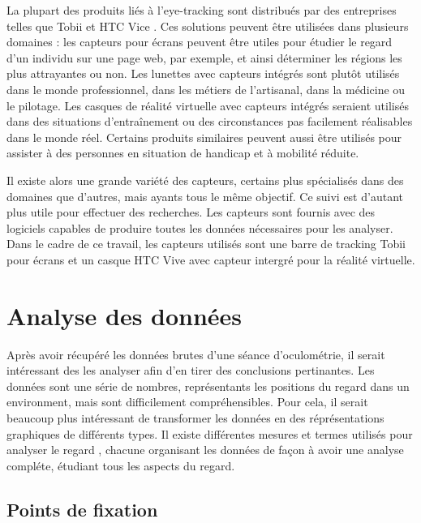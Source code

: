 \documentclass[12pt]{article}
\begin{document}
\bigskip
La plupart des produits liés à l'eye-tracking sont distribués par des
entreprises telles que Tobii \cite{tobii} et HTC Vice \cite{htc_vive_pro_eye}.
Ces solutions peuvent être utilisées dans plusieurs domaines \cite{yt:tobii_vr}
: les capteurs pour écrans peuvent être utiles pour étudier le regard d'un
individu sur une page web, par exemple, et ainsi déterminer les régions les
plus attrayantes ou non. Les lunettes avec capteurs intégrés sont plutôt
utilisés dans le monde professionnel, dans les métiers de l'artisanal, dans la
médicine ou le pilotage. Les casques de réalité virtuelle avec capteurs
intégrés seraient utilisés dans des situations d'entraînement ou des
circonstances pas facilement réalisables dans le monde réel. Certains produits
similaires peuvent aussi être utilisés pour assister à des personnes en
situation de handicap et à mobilité réduite.

\bigskip
Il existe alors une grande variété des capteurs, certains plus spécialisés dans
des domaines que d'autres, mais ayants tous le même objectif. Ce suivi est
d'autant plus utile pour effectuer des recherches. Les capteurs sont fournis
avec des logiciels capables de produire toutes les données nécessaires
pour les analyser. Dans le cadre de ce travail, les capteurs utilisés sont une
barre de tracking Tobii pour écrans et un casque HTC Vive avec capteur intergré
pour la réalité virtuelle.


\section{Analyse des données}

Après avoir récupéré les données brutes d'une séance d'oculométrie, il serait
intéressant des les analyser afin d'en tirer des conclusions pertinantes. Les
données sont une série de nombres, représentants les positions du regard dans un
environment, mais sont difficilement compréhensibles. Pour cela, il serait
beaucoup plus intéressant de transformer les données en des réprésentations
graphiques de différents types. Il existe différentes mesures et termes
utilisés pour analyser le regard \cite{imotions:metrics}, chacune organisant
les données de façon à avoir une analyse compléte, étudiant tous les aspects du
regard.

\subsection{Points de fixation}
\end{document}
